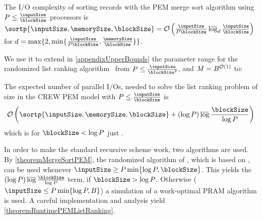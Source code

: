 \documentclass[envcountsame]{llncs}
\newcommand{\lgb}{\mathop{\mathrm{l\hbox to 0pt{\kern .05em $\overline{\vbox to 1.1ex{\hbox to .85em {~}}}$\hss}og}}\nolimits}
\def\bO#1{\printmath{\mathcal{O}\left(#1\right)}}
\begin{document}
\begin{lemma}
\label{theoremMergeSortPEM}
The I/O complexity of sorting  records with the PEM merge sort algorithm using $P\leq\frac{\inputSize}{\blockSize}$ processors is $\sortp{\inputSize,\memorySize,\blockSize}=\bO{\frac{\inputSize}{P\blockSize}\lgb_d\frac{\inputSize}{\blockSize}}$ for $d=\max\{2,\min\{\frac{\inputSize}{P\blockSize},\frac{\memorySize}{\blockSize}\}\}$. 
\end{lemma}

We use it to extend in \autoref{appendixUpperBounds} the parameter range for the randomized list ranking algorithm~\cite{2010ArgeEtAlGraphAlgoPEM} from $P\leq\frac{\inputSize}{\blockSize^2}$, and $M=B^{\bO{1}}$ to:

\begin{theorem}
\label{theoremRuntimePEMListRanking}
The expected number of parallel I/Os, needed to solve the list ranking problem of size  in the CREW PEM model with $P\leq \frac{\inputSize}{\blockSize}$ is 
\begin{eqnarray*}
\mathcal{O}\left(\sortp{\inputSize,\memorySize,\blockSize}+(\log P)\lgb\frac{\blockSize}{\log P}\right) \end{eqnarray*}
which is for $\blockSize < \log P$ just . 
\end{theorem}

In order to make the standard recursive scheme work, two algorithms are used.
By \autoref{theoremMergeSortPEM}, the randomized algorithm of \cite{2010ArgeEtAlGraphAlgoPEM}, which is based on \cite{1984VishkinRandomizedLR}, can be used whenever $\inputSize \geq P\min\{\log P,\blockSize\}$.
This yields the $(\log P)\lgb\frac{\blockSize}{\log P}$ term, if $\blockSize >\log P$.
Otherwise ($\inputSize\leq P\min\{\log P,B\}$) a simulation of a work-optimal PRAM algorithm \cite{1988AndersonMillerDetLR} is used.
A careful implementation and analysis yield \autoref{theoremRuntimePEMListRanking}.



\end{document}
